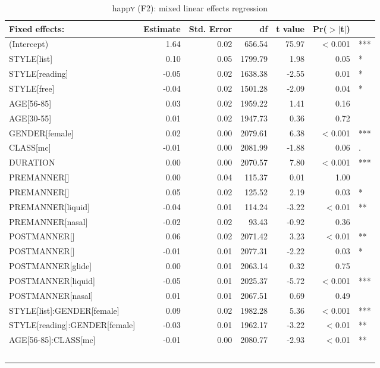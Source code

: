 {
	\footnotesize
	\begin{longtable}[c]{p{}rrrrrl}
		\caption{happ\textsc{y} (F2): mixed linear effects regression}\label{tab.regression.happy.f2}\\

		\hline
		Fixed effects: & Estimate & Std. Error & df & t value & Pr($>$$|$t$|$) & \\ 
		\hline
		(Intercept) & 1.64 & 0.02 & 656.54 & 75.97 & < 0.001 & *** \\ 
		STYLE[list] & 0.10 & 0.05 & 1799.79 & 1.98 & 0.05 & *\\ 
		STYLE[reading] & -0.05 & 0.02 & 1638.38 & -2.55 & 0.01 & *\\ 
		STYLE[free] & -0.04 & 0.02 & 1501.28 & -2.09 & 0.04 & *\\ 
		AGE[56-85] & 0.03 & 0.02 & 1959.22 & 1.41 & 0.16 & \\ 
		AGE[30-55] & 0.01 & 0.02 & 1947.73 & 0.36 & 0.72 & \\ 
		GENDER[female] & 0.02 & 0.00 & 2079.61 & 6.38 & < 0.001 & *** \\ 
		CLASS[mc] & -0.01 & 0.00 & 2081.99 & -1.88 & 0.06 & .\\ 
		DURATION & 0.00 & 0.00 & 2070.57 & 7.80 & < 0.001 & *** \\ 
		PREMANNER[\isi{affricate}] & 0.00 & 0.04 & 115.37 & 0.01 & 1.00 & \\ 
		PREMANNER[\isi{fricative}] & 0.05 & 0.02 & 125.52 & 2.19 & 0.03 & *\\ 
		PREMANNER[liquid] & -0.04 & 0.01 & 114.24 & -3.22 & < 0.01 & ** \\ 
		PREMANNER[nasal] & -0.02 & 0.02 & 93.43 & -0.92 & 0.36 & \\ 
		POSTMANNER[\isi{affricate}] & 0.06 & 0.02 & 2071.42 & 3.23 & < 0.01 & ** \\ 
		POSTMANNER[\isi{fricative}] & -0.01 & 0.01 & 2077.31 & -2.22 & 0.03 & * \\ 
		POSTMANNER[glide] & 0.00 & 0.01 & 2063.14 & 0.32 & 0.75 & \\ 
		POSTMANNER[liquid] & -0.05 & 0.01 & 2025.37 & -5.72 & < 0.001 & *** \\ 
		POSTMANNER[nasal] & 0.01 & 0.01 & 2067.51 & 0.69 & 0.49 & \\ 
		STYLE[list]:GENDER[female] & 0.09 & 0.02 & 1982.28 & 5.36 & < 0.001 & *** \\ 
		STYLE[reading]:GENDER[female] & -0.03 & 0.01 & 1962.17 & -3.22 & < 0.01 & ** \\ 
		AGE[56-85]:CLASS[mc] & -0.01 & 0.00 & 2080.77 & -2.93 & < 0.01 & ** \\ 
$$
\end{longtable}}

